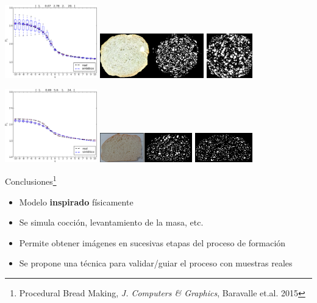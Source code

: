 \documentclass[spanish,unknownkeysallowed,10pt]{beamer}
\begin{document}
\begin{frame}
\includegraphics[width=4cm]{../figures/bestboxplot}
\includegraphics[width=4.5cm]{../figures/realbin}
\includegraphics[width=2cm]{../figures/best}

\includegraphics[width=4cm]{../figures/bestboxplot2}
\includegraphics[width=4cm]{../figures/realbin2}
\includegraphics[width=2.5cm]{../figures/best2}
\end{frame}




\begin{frame}{Conclusiones\footnote{Procedural Bread Making, {\it J. Computers \& Graphics}, Baravalle et.al. 2015}}
\begin{block}{}
\begin{itemize}
\item Modelo \textbf{inspirado} físicamente
\item Se simula cocción, levantamiento de la masa, etc.
\item Permite obtener imágenes en sucesivas etapas del proceso de formación
\item Se propone una técnica para validar/guiar el proceso con muestras reales
\end{itemize}
\end{block}
\end{frame}
\end{document}
